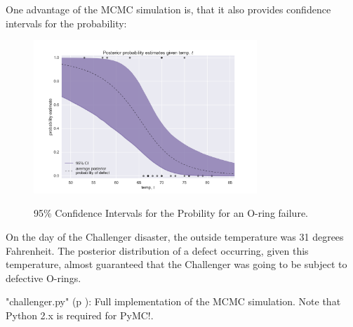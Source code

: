 One advantage of the MCMC simulation is, that it also provides confidence intervals for the probability:

\begin{figure}[H]
  \centering
  \includegraphics[width=0.75\textwidth]{../Images/Challenger_CIs.png}\\
  \caption{95\% Confidence Intervals for the Probility for an O-ring failure.}
\end{figure}

On the day of the Challenger disaster, the outside temperature was 31 degrees Fahrenheit. The posterior distribution of a defect occurring, given this temperature, almost guaranteed that the Challenger was going to be subject to defective O-rings.

\PyImg "challenger.py" (p \pageref{py:Challenger}): Full implementation of the MCMC simulation. Note that Python 2.x is required for PyMC!.


